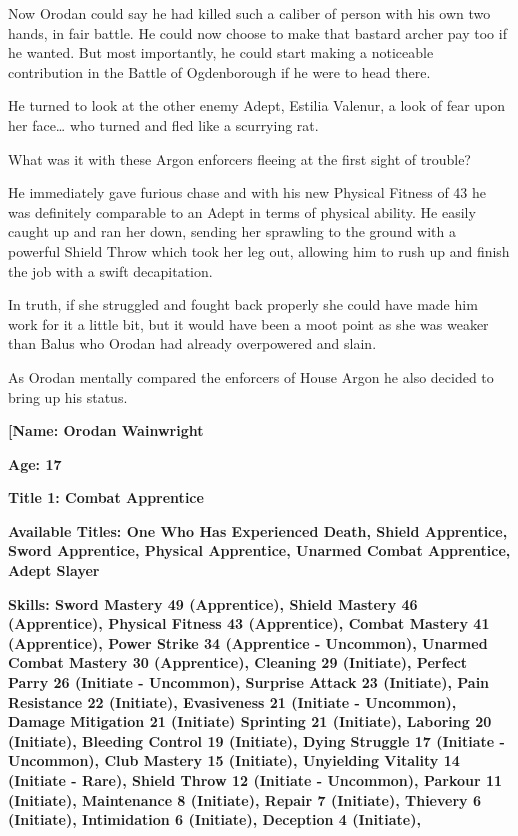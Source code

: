 \documentclass[a4paper,10pt]{book}
\begin{document}
Now Orodan could say he had killed such a caliber of person with his own two hands, in fair battle. He could now choose to make that bastard archer pay too if he wanted. But most importantly, he could start making a noticeable contribution in the Battle of Ogdenborough if he were to head there.\par
He turned to look at the other enemy Adept, Estilia Valenur, a look of fear upon her face… who turned and fled like a scurrying rat.\par
What was it with these Argon enforcers fleeing at the first sight of trouble?\par
He immediately gave furious chase and with his new Physical Fitness of 43 he was definitely comparable to an Adept in terms of physical ability. He easily caught up and ran her down, sending her sprawling to the ground with a powerful Shield Throw which took her leg out, allowing him to rush up and finish the job with a swift decapitation.\par
In truth, if she struggled and fought back properly she could have made him work for it a little bit, but it would have been a moot point as she was weaker than Balus who Orodan had already overpowered and slain.\par
As Orodan mentally compared the enforcers of House Argon he also decided to bring up his status.\par
\textbf{[Name: Orodan Wainwright}\par
\textbf{Age: 17}\par
\textbf{Title 1: Combat Apprentice}\par
\textbf{Available Titles: One Who Has Experienced Death, Shield Apprentice, Sword Apprentice, Physical Apprentice, Unarmed Combat Apprentice, Adept Slayer}\par
\textbf{Skills: Sword Mastery 49 (Apprentice), Shield Mastery 46 (Apprentice), Physical Fitness 43 (Apprentice), Combat Mastery 41 (Apprentice), Power Strike 34 (Apprentice - Uncommon), Unarmed Combat Mastery 30 (Apprentice), Cleaning 29 (Initiate), Perfect Parry 26 (Initiate - Uncommon), Surprise Attack 23 (Initiate), Pain Resistance 22 (Initiate), Evasiveness 21 (Initiate - Uncommon), Damage Mitigation 21 (Initiate) Sprinting 21 (Initiate), Laboring 20 (Initiate), Bleeding Control 19 (Initiate), Dying Struggle 17 (Initiate - Uncommon), Club Mastery 15 (Initiate), Unyielding Vitality 14 (Initiate - Rare), Shield Throw 12 (Initiate - Uncommon), Parkour 11 (Initiate), Maintenance 8 (Initiate), Repair 7 (Initiate), Thievery 6 (Initiate), Intimidation 6 (Initiate), Deception 4 (Initiate), }\par
\end{document}
